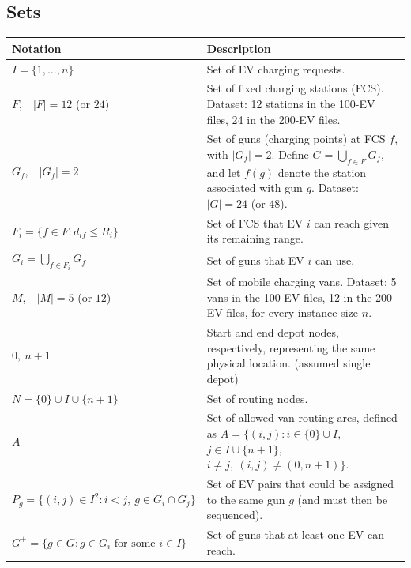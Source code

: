 \documentclass[12pt,a4paper]{article}
\begin{document}
\subsection*{Sets}
\begin{tabularx}{\textwidth}{@{}>{\raggedright\arraybackslash}p{4.6cm}X@{}}
\toprule
\textbf{Notation} & \textbf{Description} \\
\midrule
$I=\{1,\dots,n\}$ & Set of EV charging requests. \\[2pt]
$F$,\ \ $|F|=12$ (or $24$) & Set of fixed charging stations (FCS). Dataset: 12 stations in the 100-EV files, 24 in the 200-EV files. \\[2pt]
$G_f$,\ \ $|G_f|=2$ & Set of guns (charging points) at FCS $f$, with $|G_f|=2$. Define $G=\bigcup_{f\in F}G_f$, and let $f(g)$ denote the station associated with gun $g$. Dataset: $|G|=24$ (or $48$). \\[2pt]
$F_i=\{f\in F: d_{if}\le R_i\}$ & Set of FCS that EV $i$ can reach given its remaining range. \\[2pt]
$G_i=\bigcup_{f\in F_i}G_f$ & Set of guns that EV $i$ can use. \\[2pt]
$M$,\ \ $|M|=5$ (or $12$) & Set of mobile charging vans. Dataset: 5 vans in the 100-EV files, 12 in the 200-EV files, for every instance size $n$. \\[2pt]
$0,\ n+1$ & Start and end depot nodes, respectively, representing the same physical location. (assumed single depot) \\[2pt]
$N=\{0\}\cup I\cup\{n+1\}$ & Set of routing nodes. \\[2pt]
$A$ & Set of allowed van-routing arcs, defined as \newline
$A=\{(i,j): i\in\{0\}\cup I,$\newline
\hspace*{3.2em}$j\in I\cup\{n+1\},$\newline
\hspace*{3.2em}$i\ne j,\ (i,j)\ne(0,n+1)\}$. \\[2pt]
$P_g=\{(i,j)\in I^2: i<j,\ g\in G_i\cap G_j\}$ & Set of EV pairs that could be assigned to the same gun $g$ (and must then be sequenced). \\[2pt]
$G^{+}=\{g\in G: g\in G_i \text{ for some } i\in I\}$ & Set of guns that at least one EV can reach. \\
\bottomrule
\end{tabularx}

\newpage
\end{document}
